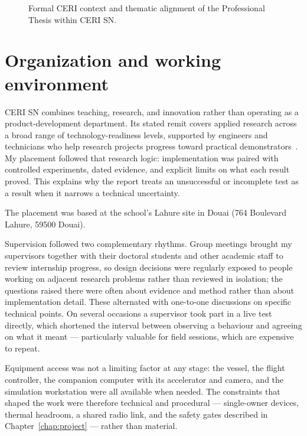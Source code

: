 \documentclass[a4paper,12pt,oneside,openany]{report}
\begin{document}
\begin{figure}[tbp]
{}
  \caption{Formal CERI context and thematic alignment of the Professional Thesis within CERI SN.}
  \label{fig:org-context}
\end{figure}

\section{Organization and working environment}
CERI SN combines teaching, research, and innovation rather than operating as a product-development
department. Its stated remit covers applied research across a broad range of technology-readiness
levels, supported by engineers and technicians who help research projects progress toward practical
demonstrators~\cite{imtneCeriSn}. My placement followed that research logic: implementation was
paired with controlled experiments, dated evidence, and explicit limits on what each result proved.
This explains why the report treats an unsuccessful or incomplete test as a result when it narrows a
technical uncertainty.

The placement was based at the school's Lahure site in Douai (764 Boulevard Lahure, 59500 Douai).

Supervision followed two complementary rhythms. Group meetings brought my supervisors together with
their doctoral students and other academic staff to review internship progress, so design decisions
were regularly exposed to people working on adjacent research problems rather than reviewed in
isolation; the questions raised there were often about evidence and method rather than about
implementation detail. These alternated with one-to-one discussions on specific technical points.
On several occasions a supervisor took part in a live test directly, which shortened the interval
between observing a behaviour and agreeing on what it meant --- particularly valuable for field
sessions, which are expensive to repeat.

Equipment access was not a limiting factor at any stage: the vessel, the flight controller, the
companion computer with its accelerator and camera, and the simulation workstation were all
available when needed. The constraints that shaped the work were therefore technical and
procedural --- single-owner devices, thermal headroom, a shared radio link, and the safety gates
described in Chapter~\ref{chap:project} --- rather than material.
\end{document}
